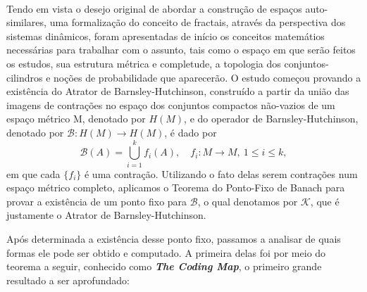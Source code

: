 \documentclass{article}
\theoremstyle{definition}
\begin{document}
\paragraph{}Tendo em vista o desejo original de abordar a construção de espaços auto-similares, uma formalização do conceito de fractais,
através da perspectiva dos sistemas dinâmicos, foram apresentadas de início os conceitos matemátios necessárias para trabalhar com o assunto,
tais como o espaço em que serão feitos os estudos, sua estrutura métrica e completude, a topologia dos conjuntos-cilindros e noções de probabilidade que aparecerão.
O estudo começou provando a existência do Atrator de Barnsley-Hutchinson, construído a partir da união das imagens de contrações no espaço dos conjuntos compactos não-vazios de um espaço métrico M, denotado por \(H(M)\), e do operador de Barnsley-Hutchinson, denotado por \(\mathcal{B}:H(M)\rightarrow H(M)\), é dado por
\[
	\mathcal{B}(A)=\bigcup_{i=1}^{k}f_{i}(A), \quad f_{i}:M\rightarrow M,\: 1\leq i\leq k,
\]
em que cada \(\{f_{i}\}\) é uma contração. Utilizando o fato delas serem contrações num espaço métrico completo, aplicamos o Teorema do Ponto-Fixo de Banach para provar a existência
de um ponto fixo para \(\mathcal{B}\), o qual denotamos por \(\mathcal{K}\), que é justamente o Atrator de Barnsley-Hutchinson.

Após determinada a existência desse ponto fixo, passamos a analisar de quais formas ele pode ser obtido e computado. A primeira delas foi por meio do teorema a seguir, conhecido como \textit{\textbf{The Coding Map}}, o primeiro
grande resultado a ser aprofundado:
\end{document}
